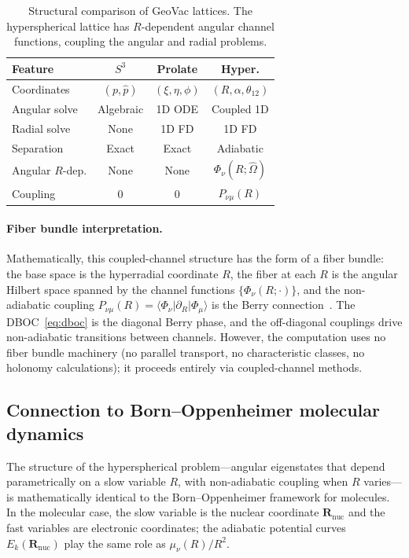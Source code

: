 \documentclass[aps,pra,twocolumn,superscriptaddress,longbibliography]{revtex4-2}
\begin{document}
\begin{table}[b]
\caption{Structural comparison of GeoVac lattices.  The
hyperspherical lattice has $R$-dependent angular channel
functions, coupling the angular and radial problems.}
\label{tab:bundle}
\begin{ruledtabular}
\begin{tabular}{lccc}
  Feature & $S^3$ & Prolate & Hyper. \\
  \hline
  Coordinates & $(p, \hat{p})$ & $(\xi,\eta,\phi)$ &
    $(R, \alpha, \theta_{12})$ \\
  Angular solve & Algebraic & 1D ODE & Coupled 1D \\
  Radial solve & None & 1D FD & 1D FD \\
  Separation & Exact & Exact & Adiabatic \\
  Angular $R$-dep. & None & None & $\Phi_\nu(R;\hat\Omega)$ \\
  Coupling & 0 & 0 & $P_{\nu\mu}(R)$ \\
\end{tabular}
\end{ruledtabular}
\end{table}

\paragraph{Fiber bundle interpretation.}
Mathematically, this coupled-channel structure has the form of a
fiber bundle: the base space is the hyperradial coordinate $R$, the
fiber at each $R$ is the angular Hilbert space spanned by the channel
functions $\{\Phi_\nu(R;\cdot)\}$, and the non-adiabatic coupling
$P_{\nu\mu}(R) = \langle\Phi_\nu|\partial_R|\Phi_\mu\rangle$ is the
Berry connection~\cite{Berry1984, Mead1992}.  The DBOC~\eqref{eq:dboc}
is the diagonal Berry phase, and the off-diagonal couplings drive
non-adiabatic transitions between channels.  However, the computation
uses no fiber bundle machinery (no parallel transport, no characteristic
classes, no holonomy calculations); it proceeds entirely via
coupled-channel methods.

\subsection{Connection to Born--Oppenheimer molecular dynamics}

The structure of the hyperspherical problem---angular eigenstates
that depend parametrically on a slow variable $R$, with
non-adiabatic coupling when $R$ varies---is mathematically identical
to the Born--Oppenheimer framework for molecules.  In the molecular
case, the slow variable is the nuclear coordinate $\bm{R}_{\mathrm{nuc}}$
and the fast variables are electronic coordinates; the adiabatic
potential curves $E_k(\bm{R}_{\mathrm{nuc}})$ play the same role as
$\mu_\nu(R)/R^2$.
\end{document}
